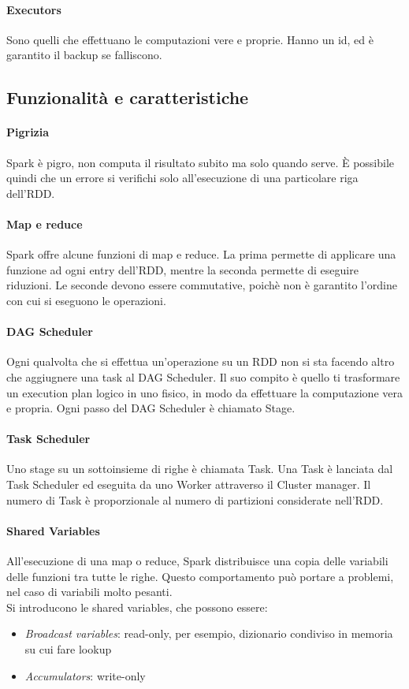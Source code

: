 \paragraph{Executors}
Sono quelli che effettuano le computazioni vere e proprie. Hanno un id, ed è 
garantito il backup se falliscono.

\subsection{Funzionalità e caratteristiche}

\paragraph{Pigrizia}
Spark è pigro, non computa il risultato subito ma solo quando serve. 
È possibile quindi che un errore si verifichi solo all'esecuzione di una particolare 
riga dell'RDD. 

\paragraph{Map e reduce}
Spark offre alcune funzioni di map e reduce. La prima permette di applicare una funzione
ad ogni entry dell'RDD, mentre la seconda permette di eseguire riduzioni. Le seconde devono essere
commutative, poichè non è garantito l'ordine con cui si eseguono le operazioni.

\paragraph{DAG Scheduler}
Ogni qualvolta che si effettua un'operazione su un RDD non si sta facendo altro che 
aggiugnere una task al DAG Scheduler. Il suo compito è quello ti trasformare un 
execution plan logico in uno fisico, in modo da effettuare la computazione vera e propria.
Ogni passo del DAG Scheduler è chiamato Stage.

\paragraph{Task Scheduler}
Uno stage su un sottoinsieme di righe è chiamata Task.
Una Task è lanciata dal Task Scheduler ed eseguita da uno Worker 
attraverso il Cluster manager. Il numero 
di Task è proporzionale al numero di partizioni considerate nell'RDD.

\paragraph{Shared Variables}
All'esecuzione di una map o reduce, Spark distribuisce una copia delle 
variabili delle funzioni tra tutte le righe. Questo comportamento 
può portare a problemi, nel caso di variabili molto pesanti.\\
Si introducono le shared variables, che possono essere:
\begin{itemize}
    \item \emph{Broadcast variables}: read-only, per esempio, dizionario 
    condiviso in memoria su cui fare lookup
    \item \emph{Accumulators}: write-only
\end{itemize}

